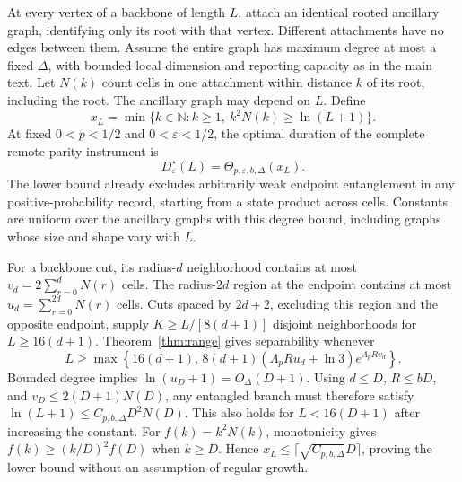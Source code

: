 \documentclass[aps,prl,twocolumn,superscriptaddress,longbibliography,reprint,floatfix]{revtex4-2}
\newcommand{\eps}{\varepsilon}
\begin{document}
At every vertex of a backbone of length $L$, attach an identical rooted
ancillary graph, identifying only its root with that vertex. Different
attachments have no edges between them. Assume the entire graph has
maximum degree at most a fixed $\Delta$, with bounded local dimension
and reporting capacity as in the main text. Let $N(k)$ count cells in
one attachment within distance $k$ of its root, including the root.
The ancillary graph may depend on $L$. Define
\begin{equation}
 x_L=\min\{k\in\mathbb N:k\ge1,\ k^2N(k)\ge\ln(L+1)\}.
 \label{eq:reservoir-scale}
\end{equation}
At fixed $0<p<1/2$ and $0<\eps<1/2$, the optimal duration of the
complete remote parity instrument is
\begin{equation}
 D^\star_\eps(L)=\Theta_{p,\eps,b,\Delta}(x_L).
 \label{eq:reservoir-time}
\end{equation}
The lower bound already excludes arbitrarily weak endpoint entanglement
in any positive-probability record, starting from a state product across
cells. Constants are uniform over the ancillary graphs with this degree
bound, including graphs whose size and shape vary with $L$.

For a backbone cut, its radius-$d$ neighborhood contains at most
$v_d=2\sum_{r=0}^dN(r)$ cells. The radius-$2d$ region at the endpoint
contains at most $u_d=\sum_{r=0}^{2d}N(r)$ cells.
Cuts spaced by $2d+2$, excluding this region and the opposite endpoint,
supply $K\ge L/[8(d+1)]$ disjoint neighborhoods for
$L\ge16(d+1)$. Theorem~\ref{thm:range} gives separability whenever
\begin{equation}
 L\ge\max\left\{16(d+1),\,
 8(d+1)(\Lambda_pRu_d+\ln3)e^{\Lambda_pRv_d}\right\}.
 \label{eq:reservoir-strict}
\end{equation}
Bounded degree implies $\ln(u_D+1)=O_\Delta(D+1)$.
Using $d\le D$, $R\le bD$, and $v_D\le2(D+1)N(D)$, any entangled
branch must therefore satisfy
$\ln(L+1)\le C_{p,b,\Delta}D^2N(D)$.
This also holds for $L<16(D+1)$ after increasing the constant.
For $f(k)=k^2N(k)$, monotonicity gives
$f(k)\ge(k/D)^2f(D)$ when $k\ge D$.
Hence $x_L\le\lceil\sqrt{C_{p,b,\Delta}}D\rceil$, proving the
lower bound without an assumption of regular growth.
\end{document}
